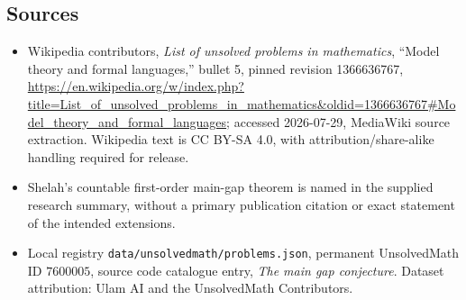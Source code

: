 \documentclass[11pt]{article}
\begin{document}
\subsection{Sources}
\begin{itemize}
\item Wikipedia contributors, \emph{List of unsolved problems in mathematics}, ``Model theory and formal languages,'' bullet 5, pinned revision 1366636767, \url{https://en.wikipedia.org/w/index.php?title=List_of_unsolved_problems_in_mathematics&oldid=1366636767#Model_theory_and_formal_languages}; accessed 2026-07-29, MediaWiki source extraction. Wikipedia text is CC BY-SA 4.0, with attribution/share-alike handling required for release.
\item Shelah's countable first-order main-gap theorem is named in the supplied research summary, without a primary publication citation or exact statement of the intended extensions.
\item Local registry \texttt{data/unsolvedmath/problems.json}, permanent UnsolvedMath ID $7600005$, source code catalogue entry, \emph{The main gap conjecture}. Dataset attribution: Ulam AI and the UnsolvedMath Contributors.
\end{itemize}
\end{document}
